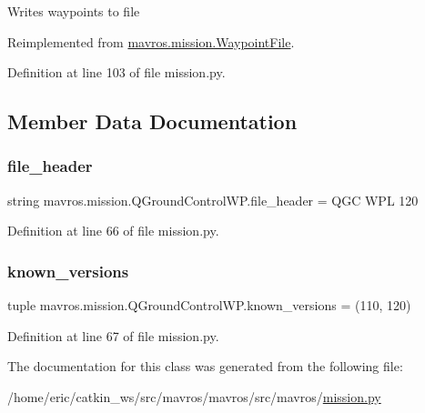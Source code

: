 \begin{DoxyVerb}Writes waypoints to file\end{DoxyVerb}
 

Reimplemented from \mbox{\hyperlink{classmavros_1_1mission_1_1WaypointFile_a04d4ed37ce9357a0467ef9226296cb49}{mavros.\+mission.\+Waypoint\+File}}.



Definition at line 103 of file mission.\+py.



\subsection{Member Data Documentation}
\mbox{\label{classmavros_1_1mission_1_1QGroundControlWP_a18fce57e1eb603454951a5f9a1dece7b}} 
\subsubsection{\texorpdfstring{file\_header}{file\_header}}
{\footnotesize\ttfamily string mavros.\+mission.\+Q\+Ground\+Control\+W\+P.\+file\+\_\+header = \textquotesingle{}Q\+GC W\+PL 120\textquotesingle{}\hspace{0.3cm}{\ttfamily [static]}}



Definition at line 66 of file mission.\+py.

\mbox{\label{classmavros_1_1mission_1_1QGroundControlWP_a4c13ee8890a26f2a76b43ee013bf7b99}} 
\subsubsection{\texorpdfstring{known\_versions}{known\_versions}}
{\footnotesize\ttfamily tuple mavros.\+mission.\+Q\+Ground\+Control\+W\+P.\+known\+\_\+versions = (110, 120)\hspace{0.3cm}{\ttfamily [static]}}



Definition at line 67 of file mission.\+py.



The documentation for this class was generated from the following file\+:\begin{DoxyCompactItemize}
\item 
/home/eric/catkin\+\_\+ws/src/mavros/mavros/src/mavros/\mbox{\hyperlink{mission_8py}{mission.\+py}}\end{DoxyCompactItemize}
